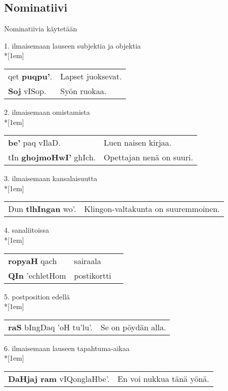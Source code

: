 \documentclass{book}
\begin{document}
\subsection{Nominatiivi}

Nominatiivia käytetään

1. ilmaisemaan lauseen subjektia ja objektia
\\*[1em]
\begin{tabular}{l l}
    qet \textbf{puqpu'}. & Lapset juoksevat. \\
    \textbf{Soj} vISop. & Syön ruokaa. \\
\end{tabular}

2. ilmaisemaan omistamista\\*[1em]
\begin{tabular}{l l}
    \textbf{be'} paq vIlaD. & Luen naisen kirjaa. \\
    tIn \textbf{ghojmoHwI'} ghIch. & Opettajan nenä on suuri. \\
\end{tabular}

3. ilmaisemaan kansalaisuutta\\*[1em]
\begin{tabular}{l l}
    Dun \textbf{tlhIngan} wo'. & Klingon-valtakunta on suuremmoinen. \\
\end{tabular}

4. sanaliitoissa\\*[1em]
\begin{tabular}{l Il}
    \textbf{ropyaH} qach & sairaala \\
    \textbf{QIn} 'echletHom & postikortti \\
\end{tabular}

5. postposition edellä
\\*[1em]
\begin{tabular}{l l}
    \textbf{raS} bIngDaq 'oH tu'lu'. & Se on pöydän alla. \\
\end{tabular}

6. ilmaisemaan lauseen tapahtuma-aikaa\\*[1em]
\begin{tabular}{l l}
    \textbf{DaHjaj ram} vIQonglaHbe'. & En voi nukkua tänä yönä. \\
\end{tabular}
\end{document}
